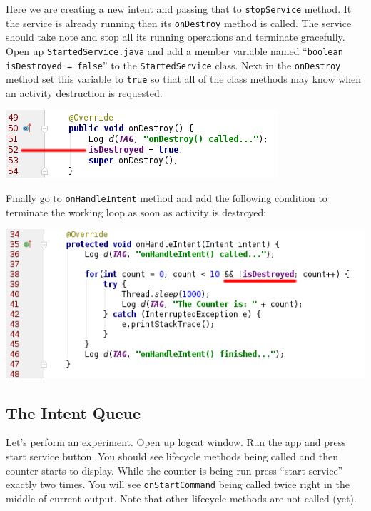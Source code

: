 Here we are creating a new intent and passing that to \texttt{stopService} method. It the service is already running then its \texttt{onDestroy} method is called. The service should take note and stop all its running operations and terminate gracefully.\\

Open up \texttt{StartedService.java} and add a member variable named ``\texttt{boolean isDestroyed = false}'' to the \texttt{StartedService} class. Next in the \texttt{onDestroy} method set this variable to \texttt{true} so that all of the class methods may know when an activity destruction is requested:

\begin{center}
	\includegraphics[scale=\SourceCodeScale]{chapters/ch14/images/14}
\end{center}

Finally go to \texttt{onHandleIntent} method and add the following condition to terminate the working loop as soon as activity is destroyed:

\begin{center}
	\includegraphics[scale=\SourceCodeScale]{chapters/ch14/images/15}
\end{center}

\subsection{The Intent Queue}
\label{TAS:intentQueue}
Let's perform an experiment. Open up logcat window. Run the app and press start service button. You should see lifecycle methods being called and then counter starts to display. While the counter is being run press ``start service'' exactly two times. You will see \texttt{onStartCommand} being called twice right in the middle of current output. Note that other lifecycle methods are not called (yet). 


